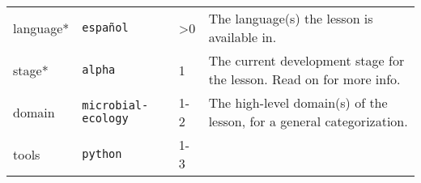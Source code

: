 \documentclass[
]{book}
\begin{document}
\begin{longtable}[]{@{}llll@{}}
\begin{minipage}[t]{0.26\columnwidth}\raggedright
language*\strut
\end{minipage} & \begin{minipage}[t]{0.26\columnwidth}\raggedright
\texttt{español}\strut
\end{minipage} & \begin{minipage}[t]{0.21\columnwidth}\raggedright
\textgreater0\strut
\end{minipage} & \begin{minipage}[t]{0.16\columnwidth}\raggedright
The language(s) the lesson is available in.\strut
\end{minipage}\tabularnewline
\begin{minipage}[t]{0.26\columnwidth}\raggedright
stage*\strut
\end{minipage} & \begin{minipage}[t]{0.26\columnwidth}\raggedright
\texttt{alpha}\strut
\end{minipage} & \begin{minipage}[t]{0.21\columnwidth}\raggedright
1\strut
\end{minipage} & \begin{minipage}[t]{0.16\columnwidth}\raggedright
The current development stage for the lesson. Read on for more info.\strut
\end{minipage}\tabularnewline
\begin{minipage}[t]{0.26\columnwidth}\raggedright
domain\strut
\end{minipage} & \begin{minipage}[t]{0.26\columnwidth}\raggedright
\texttt{microbial-ecology}\strut
\end{minipage} & \begin{minipage}[t]{0.21\columnwidth}\raggedright
1-2\strut
\end{minipage} & \begin{minipage}[t]{0.16\columnwidth}\raggedright
The high-level domain(s) of the lesson, for a general categorization.\strut
\end{minipage}\tabularnewline
\begin{minipage}[t]{0.26\columnwidth}\raggedright
tools\strut
\end{minipage} & \begin{minipage}[t]{0.26\columnwidth}\raggedright
\texttt{python}\strut
\end{minipage} & \begin{minipage}[t]{0.21\columnwidth}\raggedright
1-3\strut
\end{minipage} & \begin{minipage}[t]{0.16\columnwidth}\raggedright

\end{minipage}
\end{longtable}
\end{document}
